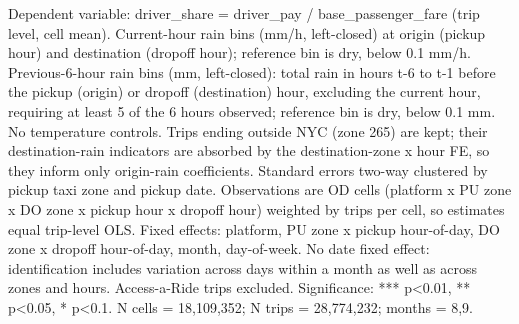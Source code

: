 \par \raggedright 
Dependent variable: driver\_share = driver\_pay / base\_passenger\_fare (trip level, cell mean). Current-hour rain bins (mm/h, left-closed) at origin (pickup hour) and destination (dropoff hour); reference bin is dry, below 0.1 mm/h. Previous-6-hour rain bins (mm, left-closed): total rain in hours t-6 to t-1 before the pickup (origin) or dropoff (destination) hour, excluding the current hour, requiring at least 5 of the 6 hours observed; reference bin is dry, below 0.1 mm. No temperature controls. Trips ending outside NYC (zone 265) are kept; their destination-rain indicators are absorbed by the destination-zone x hour FE, so they inform only origin-rain coefficients. Standard errors two-way clustered by pickup taxi zone and pickup date. Observations are OD cells (platform x PU zone x DO zone x pickup hour x dropoff hour) weighted by trips per cell, so estimates equal trip-level OLS. Fixed effects: platform, PU zone x pickup hour-of-day, DO zone x dropoff hour-of-day, month, day-of-week. No date fixed effect: identification includes variation across days within a month as well as across zones and hours. Access-a-Ride trips excluded. Significance: *** p<0.01, ** p<0.05, * p<0.1. N cells = 18,109,352; N trips = 28,774,232; months = 8,9.
\par\endgroup


\ifdefined\ifclassloaded
{}
\fi
